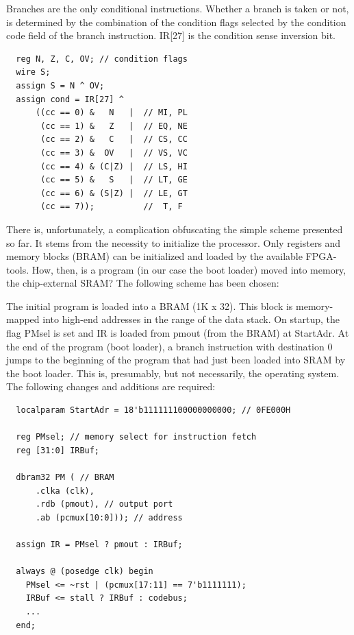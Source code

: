 Branches are the only conditional instructions. Whether a branch is taken or not, is determined by
the combination of the condition flags selected by the condition code field of the branch
instruction. IR[27] is the condition sense inversion bit.

\begin{verbatim}
  reg N, Z, C, OV; // condition flags
  wire S;
  assign S = N ^ OV;
  assign cond = IR[27] ^
      ((cc == 0) &   N   |  // MI, PL
       (cc == 1) &   Z   |  // EQ, NE
       (cc == 2) &   C   |  // CS, CC
       (cc == 3) &  OV   |  // VS, VC
       (cc == 4) & (C|Z) |  // LS, HI
       (cc == 5) &   S   |  // LT, GE
       (cc == 6) & (S|Z) |  // LE, GT
       (cc == 7));          //  T, F
\end{verbatim}

There is, unfortunately, a complication obfuscating the simple scheme presented so far. It stems
from the necessity to initialize the processor. Only registers and memory blocks (BRAM) can be
initialized and loaded by the available FPGA-tools. How, then, is a program (in our case the boot
loader) moved into memory, the chip-external SRAM? The following scheme has been chosen:

The initial program is loaded into a BRAM (1K x 32). This block is memory-mapped into high-end
addresses in the range of the data stack. On startup, the flag PMsel is set and IR is loaded from
pmout (from the BRAM) at StartAdr. At the end of the program (boot loader), a branch instruction
with destination 0 jumps to the beginning of the program that had just been loaded into SRAM by
the boot loader. This is, presumably, but not necessarily, the operating system. The following
changes and additions are required:

\begin{verbatim}
  localparam StartAdr = 18'b111111100000000000; // 0FE000H

  reg PMsel; // memory select for instruction fetch
  reg [31:0] IRBuf;

  dbram32 PM ( // BRAM
      .clka (clk),
      .rdb (pmout), // output port
      .ab (pcmux[10:0])); // address

  assign IR = PMsel ? pmout : IRBuf;

  always @ (posedge clk) begin
    PMsel <= ~rst | (pcmux[17:11] == 7'b1111111);
    IRBuf <= stall ? IRBuf : codebus;
    ...
  end;
\end{verbatim}
